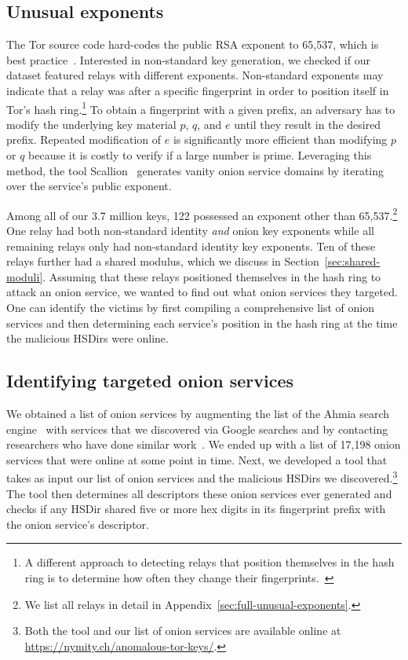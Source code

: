 \subsection{Unusual exponents}
\label{sec:unusual-exponents}
The Tor source code hard-codes the public RSA exponent to 65,537, which is best
practice~\cite[\S~4]{Boneh1999a}.  Interested in non-standard key generation, we
checked if our dataset featured relays with different exponents.  Non-standard
exponents may indicate that a relay was after a specific fingerprint in order to
position itself in Tor's hash ring.\footnote{A different approach to detecting
relays that position themselves in the hash ring is to determine how often they
change their fingerprints.~\cite[\S~4.3.3]{Winter2016a}} To obtain a fingerprint
with a given prefix, an adversary has to modify the underlying key material $p$,
$q$, and $e$ until they result in the desired prefix.  Repeated modification of
$e$ is significantly more efficient than modifying $p$ or $q$ because it is
costly to verify if a large number is prime.  Leveraging this method, the tool
Scallion~\cite{scallion} generates vanity onion service domains by iterating
over the service's public exponent.

Among all of our 3.7 million keys, 122 possessed an exponent other than
65,537.\footnote{We list all relays in detail in
Appendix~\ref{sec:full-unusual-exponents}.} One relay had both non-standard
identity \emph{and} onion key exponents while all remaining relays only had
non-standard identity key exponents.  Ten of these relays further had a shared
modulus, which we discuss in Section~\ref{sec:shared-moduli}.  Assuming that
these relays positioned themselves in the hash ring to attack an onion service,
we wanted to find out what onion services they targeted.  One can identify the
victims by first compiling a comprehensive list of onion services and then
determining each service's position in the hash ring at the time the malicious
HSDirs were online.

\subsection{Identifying targeted onion services}
\label{sec:targeted-onion-services}

We obtained a list of onion services by augmenting the list of the Ahmia
search engine~\cite{ahmia} with services that we discovered via Google searches
and by contacting researchers who have done similar work~\cite{Matic2015a}.  We
ended up with a list of 17,198 onion services that were online at some point in
time.  Next, we developed a tool that takes as input our list of onion services
and the malicious HSDirs we discovered.\footnote{Both the tool and our list of
onion services are available online at
\url{https://nymity.ch/anomalous-tor-keys/}.} The tool then determines all
descriptors these onion services ever generated and checks if any HSDir shared
five or more hex digits in its fingerprint prefix with the onion service's
descriptor.

